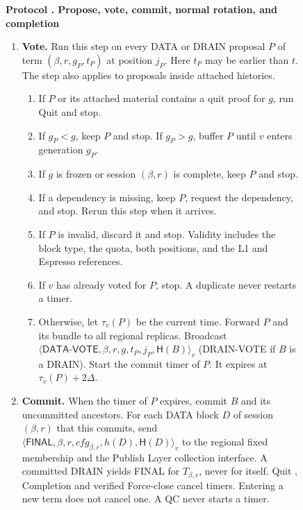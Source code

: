 \documentclass[11pt,a4paper]{article}
\newcommand{\RR}[1]{{\color{rrRed}#1}}
\newcommand{\Hash}{\mathsf H}
\newcommand{\tagg}[1]{\ensuremath{\mathsf{#1}}}
\newcounter{protocol}
\newenvironment{protocol}[3][htbp]{\begin{figure}[#1]\refstepcounter{protocol}\label{#2}
\begin{mdframed}[linewidth=.6pt,skipabove=0pt,skipbelow=0pt,
innertopmargin=7pt,innerbottommargin=7pt]\small
\textbf{Protocol \theprotocol. #3}\par\smallskip}{\end{mdframed}\end{figure}}
\begin{document}
\begin{protocol}{alg:steady}{Propose, vote, commit, normal rotation\RR{, and completion}}
\begin{enumerate}[label=\textbf{\arabic*)},itemsep=3pt]
\item \textbf{Vote.} Run this step on every DATA \RR{or DRAIN} proposal
$P$ of term $(\beta,r,g_P,t_P)$ at position $j_P$. Here $t_P$ may be earlier
than $t$. The step also applies to proposals inside attached histories.
 \begin{enumerate}[label=(\alph*)]
 \item If $P$ or its attached material contains a quit proof for $g$,
       run Quit and stop.
 \item If $g_P<g$, keep $P$ and stop. If $g_P>g$, buffer $P$
       until $v$ enters generation $g_P$.
 \item If $g$ is frozen \RR{or session $(\beta,r)$ is complete}, keep $P$ and
       stop.
 \item If a dependency is missing, keep $P$, request the dependency,
       and stop. Rerun this step when it arrives.
 \item If $P$ is invalid, discard it and stop. \RR{Validity includes the
       block type, the quota, both positions, and the L1 and Espresso references.}
 \item If $v$ has already voted for $P$, stop.
       A duplicate never restarts a timer.
 \item Otherwise, let $\tau_v(P)$ be the current time. Forward $P$ and
       its bundle to all \RR{regional replicas. }
       Broadcast
       $\langle\tagg{DATA\mbox{-}VOTE},\beta,r,g,t_P,j_P,\Hash(B)\rangle_v$
       \RR{(DRAIN-VOTE if $B$ is a DRAIN)}.
       Start the commit timer of $P$. It expires at $\tau_v(P)+2\Delta$.
 \end{enumerate}

\item \textbf{Commit.} When the timer of $P$ expires, commit $B$ and
its uncommitted ancestors. \RR{For each DATA block $D$ of session $(\beta,r)$
that this commits, send
$\langle\tagg{FINAL},\beta,r,\mathit{cfg}_{\beta,r},h(D),\Hash(D)\rangle_v$ to the regional fixed membership and the Publish Layer collection interface. A committed DRAIN yields FINAL for $T_{\beta,r}$, never for
itself. } Quit \RR{, Completion and verified Force-close} cancel timers.
Entering a new term does not cancel one. A QC never starts a timer.


\end{enumerate}
\end{protocol}
\end{document}
